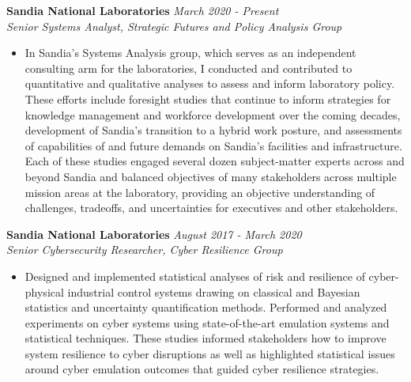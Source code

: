 \documentclass[11pt]{article}
\newenvironment{changemargin}[2]{%
  \begin{list}{}{%
    \setlength{\topsep}{0pt}%
    \setlength{\leftmargin}{#1}%
    \setlength{\rightmargin}{#2}%
    \setlength{\listparindent}{\parindent}%
    \setlength{\itemindent}{\parindent}%
    \setlength{\parsep}{\parskip}%
  }%
  \item[]}{\end{list}
}
\newenvironment{body} {
	\vspace*{-16pt}
	\begin{changemargin}{-0.25in}{-0.5in}
  }	
	{\end{changemargin}
}
\begin{document}
\begin{body}
	\vspace{12pt}
	
	\textbf{Sandia National Laboratories} \hfill \emph{March 2020 - Present}\\
	\emph{Senior Systems Analyst, Strategic Futures and Policy Analysis Group}
	\vspace*{-4pt}
	\begin{itemize}
		\item In Sandia's Systems Analysis group, which serves as an independent consulting arm for the laboratories, I conducted and contributed to quantitative and qualitative analyses to assess and inform laboratory policy. These efforts include foresight studies that continue to inform strategies for knowledge management and workforce development over the coming decades, development of Sandia's transition to a hybrid work posture, and assessments of capabilities of and future demands on Sandia's facilities and infrastructure. Each of these studies engaged several dozen subject-matter experts across and beyond Sandia and balanced objectives of many stakeholders across multiple mission areas at the laboratory, providing an objective understanding of challenges, tradeoffs, and uncertainties for executives and other stakeholders.
	\end{itemize}	
	
	\textbf{Sandia National Laboratories} \hfill \emph{August 2017 - March 2020}\\
	\emph{Senior Cybersecurity Researcher, Cyber Resilience Group}
	\vspace*{-4pt}
	\begin{itemize}
		\item Designed and implemented statistical analyses of risk and resilience of cyber-physical industrial control systems drawing on classical and Bayesian statistics and uncertainty quantification methods. Performed and analyzed experiments on cyber systems using state-of-the-art emulation systems and statistical techniques. These studies informed stakeholders how to improve system resilience to cyber disruptions as well as highlighted statistical issues around cyber emulation outcomes that guided cyber resilience strategies.
	\end{itemize}	
	
	

\end{body}
\end{document}
